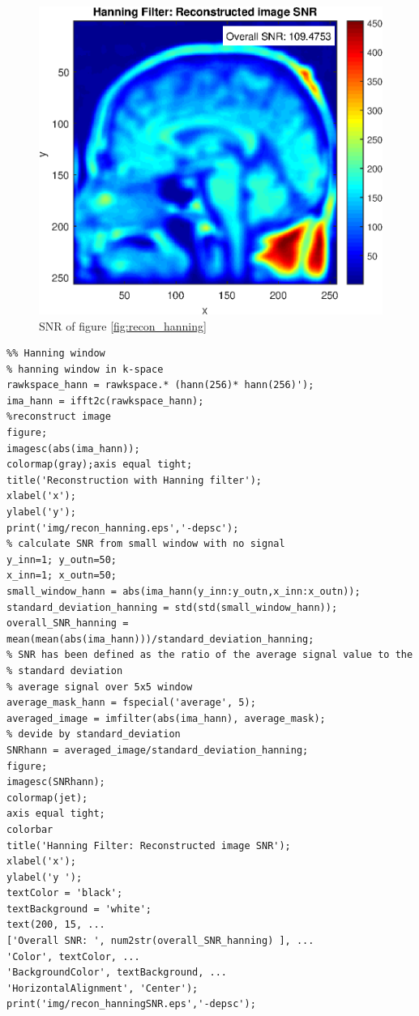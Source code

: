     \begin{figure}[h]
    \includegraphics[width=\linewidth] {./homework4/img/recon_hanningSNR.eps}
    \caption{SNR of figure \ref{fig:recon_hanning}}
    \label{fig:recon_hanningSNR}
    \end{figure}

\clearpage

\begin{lstlisting}
%% Hanning window
% hanning window in k-space
rawkspace_hann = rawkspace.* (hann(256)* hann(256)');
ima_hann = ifft2c(rawkspace_hann);
%reconstruct image
figure;
imagesc(abs(ima_hann));
colormap(gray);axis equal tight;
title('Reconstruction with Hanning filter');
xlabel('x');
ylabel('y');
print('img/recon_hanning.eps','-depsc');
% calculate SNR from small window with no signal
y_inn=1; y_outn=50;
x_inn=1; x_outn=50;
small_window_hann = abs(ima_hann(y_inn:y_outn,x_inn:x_outn));
standard_deviation_hanning = std(std(small_window_hann));
overall_SNR_hanning = mean(mean(abs(ima_hann)))/standard_deviation_hanning;
% SNR has been defined as the ratio of the average signal value to the
% standard deviation
% average signal over 5x5 window
average_mask_hann = fspecial('average', 5);
averaged_image = imfilter(abs(ima_hann), average_mask);
% devide by standard_deviation
SNRhann = averaged_image/standard_deviation_hanning;
figure;
imagesc(SNRhann);
colormap(jet);
axis equal tight;
colorbar
title('Hanning Filter: Reconstructed image SNR');
xlabel('x');
ylabel('y ');
textColor = 'black';
textBackground = 'white';
text(200, 15, ...
['Overall SNR: ', num2str(overall_SNR_hanning) ], ...
'Color', textColor, ...
'BackgroundColor', textBackground, ...
'HorizontalAlignment', 'Center');
print('img/recon_hanningSNR.eps','-depsc');
\end{lstlisting}



